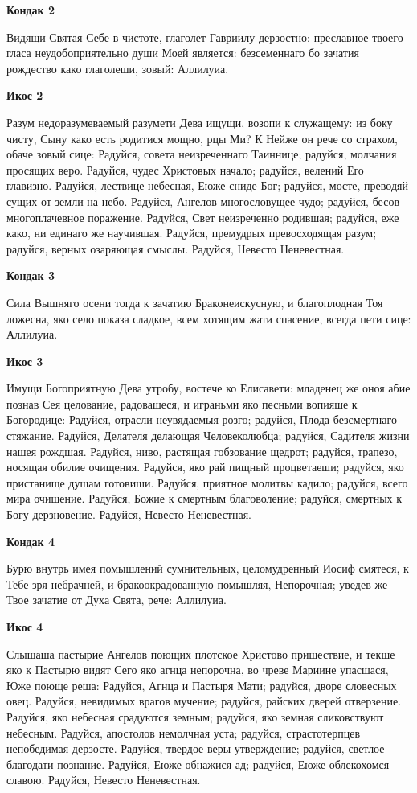 \bfseries Кондак 2\normalfont{}

Видящи Святая Себе в чистоте, глаголет Гавриилу дерзостно: преславное твоего гласа неудобоприятельно души Моей является: безсеменнаго бо зачатия рождество како глаголеши, зовый: Аллилуиа.


\bfseries Икос 2\normalfont{}

Разум недоразумеваемый разумети Дева ищущи, возопи к служащему: из боку чисту, Сыну како есть родитися мощно, рцы Ми? К Нейже он рече со страхом, обаче зовый сице: Радуйся, совета неизреченнаго Таиннице; радуйся, молчания просящих веро. Радуйся, чудес Христовых начало; радуйся, велений Его главизно. Радуйся, лествице небесная, Еюже сниде Бог; радуйся, мосте, преводяй сущих от земли на небо. Радуйся, Ангелов многословущее чудо; радуйся, бесов многоплачевное поражение. Радуйся, Свет неизреченно родившая; радуйся, еже како, ни единаго же научившая. Радуйся, премудрых превосходящая разум; радуйся, верных озаряющая смыслы. Радуйся, Невесто Неневестная.


\bfseries Кондак 3\normalfont{}


Сила Вышняго осени тогда к зачатию Браконеискусную, и благоплодная Тоя ложесна, яко село показа сладкое, всем хотящим жати спасение, всегда пети сице: Аллилуиа.


\bfseries Икос 3\normalfont{}


Имущи Богоприятную Дева утробу, востече ко Елисавети: младенец же оноя абие познав Сея целование, радовашеся, и играньми яко песньми вопияше к Богородице: Радуйся, отрасли неувядаемыя розго; радуйся, Плода безсмертнаго стяжание. Радуйся, Делателя делающая Человеколюбца; радуйся, Садителя жизни нашея рождшая. Радуйся, ниво, растящая гобзование щедрот; радуйся, трапезо, носящая обилие очищения. Радуйся, яко рай пищный процветаеши; радуйся, яко пристанище душам готовиши. Радуйся, приятное молитвы кадило; радуйся, всего мира очищение. Радуйся, Божие к смертным благоволение; радуйся, смертных к Богу дерзновение. Радуйся, Невесто Неневестная.


\bfseries Кондак 4\normalfont{}


Бурю внутрь имея помышлений сумнительных, целомудренный Иосиф смятеся, к Тебе зря небрачней, и бракоокрадованную помышляя, Непорочная; уведев же Твое зачатие от Духа Свята, рече: Аллилуиа.


\bfseries Икос 4\normalfont{}


Слышаша пастырие Ангелов поющих плотское Христово пришествие, и текше яко к Пастырю видят Сего яко агнца непорочна, во чреве Мариине упасшася, Юже поюще реша: Радуйся, Агнца и Пастыря Мати; радуйся, дворе словесных овец. Радуйся, невидимых врагов мучение; радуйся, райских дверей отверзение. Радуйся, яко небесная срадуются земным; радуйся, яко земная сликовствуют небесным. Радуйся, апостолов немолчная уста; радуйся, страстотерпцев непобедимая дерзосте. Радуйся, твердое веры утверждение; радуйся, светлое благодати познание. Радуйся, Еюже обнажися ад; радуйся, Еюже облекохомся славою. Радуйся, Невесто Неневестная.


